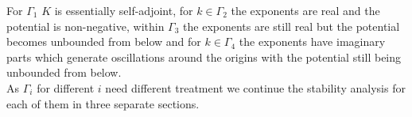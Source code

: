 For $\Gamma_1$ $K$ is essentially self-adjoint, for $k\in\Gamma_2$ the
exponents are real and the potential is non-negative, within
$\Gamma_3$ the exponents are still real but the potential becomes
unbounded from below and for $k\in\Gamma_4$ the exponents have
imaginary parts which generate oscillations around the origins with
the potential still being unbounded from below.\\

As $\Gamma_i$ for different $i$ need different treatment we continue
the stability analysis for each of them in three separate sections.

